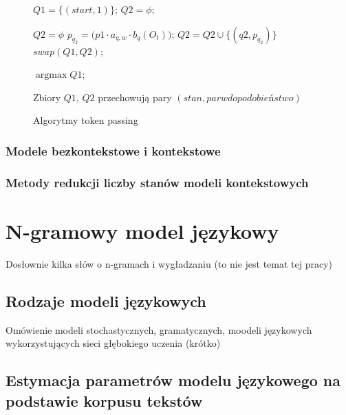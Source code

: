 \documentclass[11pt]{article}
\DeclareMathOperator*{\argmax}{\arg\max}   %
\begin{document}
		    \begin{figure}
		    	\begin{algorithmic}[1]
		    		
		    		
		    		\STATE $Q1 = \{(start, 1)\}$; 
		    		\STATE $Q2 = \phi$;		    
		    		
			    		\STATE $Q2 = \phi$
					    		\STATE $p_{q_2} = \bigg( p1\cdot a_{q,w}\cdot b_q(O_t) \label{line:b_q} \bigg)$;				    	
					    		\STATE $Q2 = Q2 \cup \{(q2, p_{q_2})\}$
				    		\ENDFOR
			    		\ENDFOR
			    		\STATE $swap(Q1, Q2)$;
		    		\ENDFOR
		    		
		    		\RETURN $\argmax{Q1}$;
		    	\end{algorithmic}
	    	
		    	Zbiory $Q1$, $Q2$ przechowują pary $(stan, parwdopodobieństwo)$ 
		    	
		    	\caption{Algorytmy token passing}
		    	\label{alg:token_passing}
		    \end{figure}		
		    
		    
       \subsubsection{ Modele bezkontekstowe i kontekstowe}
       \subsubsection{ Metody redukcji liczby stanów modeli kontekstowych }	

\section{N-gramowy model językowy}
	\label{sec:ngramm}
	Dosłownie kilka słów o n-gramach i wygładzaniu (to nie jest temat tej pracy)
    \subsection{ Rodzaje modeli językowych }
      Omówienie modeli stochastycznych, gramatycznych, moodeli językowych wykorzystujących sieci głębokiego uczenia (krótko)
    \subsection{ Estymacja parametrów modelu językowego na podstawie korpusu tekstów }
\end{document}
